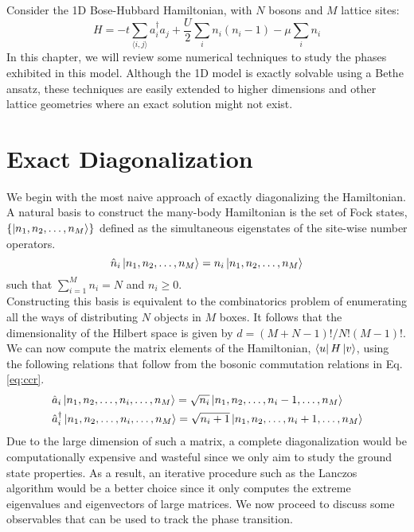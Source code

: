 Consider the 1D Bose-Hubbard Hamiltonian, with $N$ bosons and $M$ lattice sites:
\begin{equation}\label{eq:bhm1}
    H = -t\sum_{\langle i, j\rangle} a_i^{\dagger}a_j + \frac{U}{2}\sum_i n_i(n_i - 1) - \mu \sum_i n_i
\end{equation}
In this chapter, we will review some numerical techniques to study the phases exhibited in this model. Although the 1D model is exactly solvable using a Bethe ansatz\cite{Fabio11}, these techniques are easily extended to higher dimensions and other lattice geometries where an exact solution might not exist.

\section{Exact Diagonalization}
We begin with the most naive approach of exactly diagonalizing the Hamiltonian. A natural basis to construct the many-body Hamiltonian is the set of Fock states, $\{\ket{n_1, n_2, \dots, n_M}\}$ defined as the simultaneous eigenstates of the site-wise number operators.
\begin{equation}
    \hat{n}_i \ket{n_1, n_2, \dots, n_M} = n_i \ket{n_1, n_2, \dots, n_M}
\end{equation}
such that $\sum_{i = 1}^{M} n_i = N$ and $n_i \geq 0$. 
\vspace{0.5cm}\\
Constructing this basis is equivalent to the combinatorics problem of enumerating all the ways of distributing $N$ objects in $M$ boxes. It follows that the dimensionality of the Hilbert space is given by $d = (M+N-1)!/N!(M-1)!$. We can now compute the matrix elements of the Hamiltonian, $\bra{u}H\ket{v}$, using the following relations that follow from the bosonic commutation relations in Eq. \eqref{eq:ccr}.
\begin{align}
&\hat{a}_i \ket{n_1, n_2, \dots, n_i, \dots, n_M} = \sqrt{n_i} \ket{n_1, n_2,  \dots, n_i - 1, \dots, n_M}\\
&\hat{a}_i^{\dagger} \ket{n_1, n_2, \dots, n_i, \dots, n_M} = \sqrt{n_i + 1} \ket{n_1, n_2,  \dots, n_i + 1, \dots, n_M}
\end{align}
Due to the large dimension of such a matrix, a complete diagonalization would be computationally expensive and wasteful since we only aim to study the ground state properties. As a result, an iterative procedure such as the Lanczos algorithm \cite{Pavarini2011TheLA} would be a better choice since it only computes the extreme eigenvalues and eigenvectors of large matrices. We now proceed to discuss some observables that can be used to track the phase transition.

